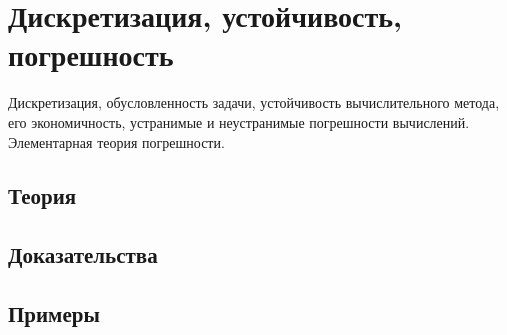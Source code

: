 
\section{Дискретизация, устойчивость, погрешность}
\label{sec:2.1.05-discretization-stability}

\begin{ticket}
Дискретизация, обусловленность задачи, устойчивость вычислительного метода, его экономичность, устранимые и неустранимые погрешности вычислений. Элементарная теория погрешности.
\end{ticket}

\subsection*{Теория}

\subsection*{Доказательства}

\subsection*{Примеры}
